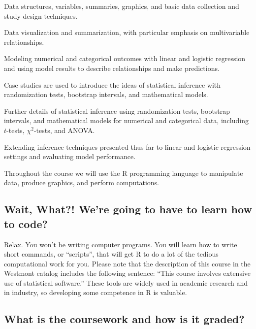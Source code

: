 \documentclass[
  twoside]{article}
\begin{document}
\begin{description}[noitemsep]
\item[Introduction to data.] Data structures, variables, summaries, graphics, and basic data collection and study design techniques.
\item[Exploratory data analysis.] Data visualization and summarization, with particular emphasis on multivariable relationships.
\item[Regression modeling.] Modeling numerical and categorical outcomes with linear and logistic regression and using model results to describe relationships and make predictions.
\item[Foundations for inference.] Case studies are used to introduce the ideas of statistical inference with randomization tests, bootstrap intervals, and mathematical models.
\item[Statistical inference.] Further details of statistical inference using randomization tests, bootstrap intervals, and mathematical models for numerical and categorical data, including $t$-tests, $\chi^2$-tests, and ANOVA.
\item[Inferential modeling.] Extending inference techniques presented thus-far to linear and logistic regression settings and evaluating model performance.
\end{description}

Throughout the course we will use the R programming language to
manipulate data, produce graphics, and perform computations.

\hypertarget{wait-what-were-going-to-have-to-learn-how-to-code}{%
\subsection{Wait, What?! We're going to have to learn how to
code?}\label{wait-what-were-going-to-have-to-learn-how-to-code}}

Relax. You won't be writing computer programs. You will learn how to
write short commands, or ``scripts'', that will get R to do a lot of the
tedious computational work for you. Please note that the description of
this course in the Westmont catalog includes the following sentence:
``This course involves extensive use of statistical software.'' These
tools are widely used in academic research and in industry, so
developing some competence in R is valuable.

\hypertarget{what-is-the-coursework-and-how-is-it-graded}{%
\subsection{What is the coursework and how is it
graded?}\label{what-is-the-coursework-and-how-is-it-graded}}
\end{document}
